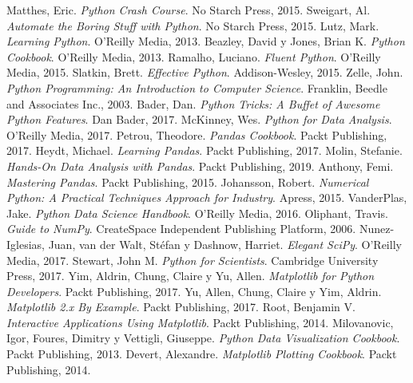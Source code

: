 \documentclass[conference]{IEEEtran}
\begin{document}

\begin{thebibliography}{00}
     Matthes, Eric. \textit{Python Crash Course}. No Starch Press, 2015.
     Sweigart, Al. \textit{Automate the Boring Stuff with Python}. No Starch Press, 2015.
     Lutz, Mark. \textit{Learning Python}. O'Reilly Media, 2013.
     Beazley, David y Jones, Brian K. \textit{Python Cookbook}. O'Reilly Media, 2013.
     Ramalho, Luciano. \textit{Fluent Python}. O'Reilly Media, 2015.
     Slatkin, Brett. \textit{Effective Python}. Addison-Wesley, 2015.
     Zelle, John. \textit{Python Programming: An Introduction to Computer Science}. Franklin, Beedle and Associates Inc., 2003.
     Bader, Dan. \textit{Python Tricks: A Buffet of Awesome Python Features}. Dan Bader, 2017.
     McKinney, Wes. \textit{Python for Data Analysis}. O'Reilly Media, 2017.
     Petrou, Theodore. \textit{Pandas Cookbook}. Packt Publishing, 2017.
     Heydt, Michael. \textit{Learning Pandas}. Packt Publishing, 2017.
     Molin, Stefanie. \textit{Hands-On Data Analysis with Pandas}. Packt Publishing, 2019.
     Anthony, Femi. \textit{Mastering Pandas}. Packt Publishing, 2015.
     Johansson, Robert. \textit{Numerical Python: A Practical Techniques Approach for Industry}. Apress, 2015.
     VanderPlas, Jake. \textit{Python Data Science Handbook}. O'Reilly Media, 2016.
     Oliphant, Travis. \textit{Guide to NumPy}. CreateSpace Independent Publishing Platform, 2006.
     Nunez-Iglesias, Juan, van der Walt, Stéfan y Dashnow, Harriet. \textit{Elegant SciPy}. O'Reilly Media, 2017.
     Stewart, John M. \textit{Python for Scientists}. Cambridge University Press, 2017.
     Yim, Aldrin, Chung, Claire y Yu, Allen. \textit{Matplotlib for Python Developers}. Packt Publishing, 2017.
     Yu, Allen, Chung, Claire y Yim, Aldrin. \textit{Matplotlib 2.x By Example}. Packt Publishing, 2017.
     Root, Benjamin V. \textit{Interactive Applications Using Matplotlib}. Packt Publishing, 2014.
     Milovanovic, Igor, Foures, Dimitry y Vettigli, Giuseppe. \textit{Python Data Visualization Cookbook}. Packt Publishing, 2013.
     Devert, Alexandre. \textit{Matplotlib Plotting Cookbook}. Packt Publishing, 2014.

\end{thebibliography}
\end{document}
